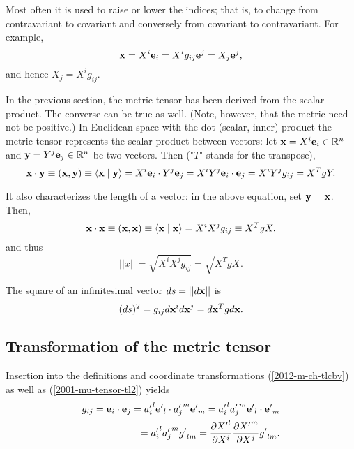 Most often it is used to raise or lower the indices; that is,
to change from contravariant to covariant and conversely from covariant
to contravariant.
{
\color{blue}
\bexample
For example,
\begin{equation}
{\bf x} =
X^i {\bf e}_i = X^i g_{ij} {\bf e}^j   = X_j {\bf e}^j,
\end{equation}
and hence $X_j = X^i g_{ij}$.
\eexample
}


In the previous section, the metric tensor has been derived from the scalar product.
The converse can be true as well.
(Note, however, that the metric need not be positive.)
In Euclidean space with the dot (scalar, inner) product
the metric tensor represents the scalar product between vectors: let
${\bf x}=X^i{\bf e}_i \in {\Bbb R}^n$ and ${\bf y}=Y^j{\bf e}_j \in {\Bbb R}^n$ be two vectors.
Then ("$T$" stands for the transpose),
\begin{equation}
{\bf x}\cdot {\bf y}\equiv ({\bf x},{\bf y})\equiv \langle {\bf x}\mid {\bf y}\rangle
= X^i {\bf e}_i\cdot Y^j {\bf e}_j
= X^iY^j {\bf e}_i\cdot  {\bf e}_j
=X^iY^j g_{ij}= X^T g Y.
\end{equation}

It also characterizes the length of a vector: in the above
equation, set ${\bf y}={\bf x}$. Then,
\begin{equation}
{\bf x}\cdot {\bf x}\equiv ({\bf x},{\bf x})\equiv \langle {\bf x}\mid {\bf x}\rangle
=X^iX^j g_{ij}\equiv X^T g X,
\end{equation}
and thus
\begin{equation}
\vert\vert  x\vert\vert  =\sqrt{X^iX^j g_{ij}}= \sqrt{X^T g X}.
\end{equation}


The square of an infinitesimal vector $ds =\vert\vert d{\bf x} \vert\vert $ is
\begin{equation}
(d s)^2  = g_{ij}d{\bf x}^id{\bf x}^j= d{\bf x}^T g d{\bf x}.
\end{equation}




\subsection{Transformation of the metric tensor}

Insertion into the definitions and coordinate transformations
(\ref{2012-m-ch-tlcbv}) as well as      (\ref{2001-mu-tensor-tl2})
yields
\begin{equation}
\begin{split}
g_{ij}={\bf e}_i\cdot {\bf e}_j
={a'_i}^l{\bf e'}_l\cdot {a'_j}^m{\bf e'}_m
={a'_i}^l {a'_j}^m {\bf e'}_l\cdot {\bf e'}_m \\
= {a'_i}^l {a'_j}^m {g'}_{lm}
= {\partial {X'}^l\over \partial X^i}{\partial {X'}^m\over \partial X^j} {g'}_{lm}
.
\label{2011-m-emtdc}
\end{split}
\end{equation}

